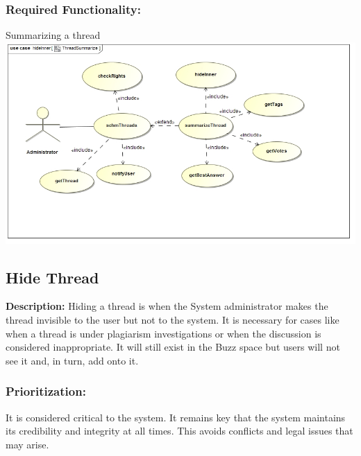\documentclass[a4paper,11pt]{article}
\begin{document}
\subsubsection{Required Functionality:} 
Summarizing a thread\\
\includegraphics[width=1\linewidth]{./Images/SCHMThread/ThreadSummarize.jpg}\\

\subsection{Hide Thread}
\textbf{Description:}
Hiding a thread is when the System administrator makes the thread invisible to the user but not to the system. It is necessary for cases like when a thread is under plagiarism investigations or when the discussion is considered inappropriate. It will still exist in the Buzz space but users will not see it and, in turn, add onto it. \\
\subsubsection{Prioritization:}
It is considered critical to the system. It remains key that the system maintains its credibility and integrity at all times. This avoids conflicts and legal issues that may arise.\\ 
\end{document}

